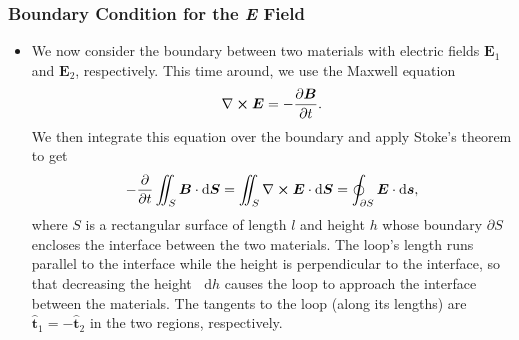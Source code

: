\documentclass[11pt, a4paper]{article}
\newcommand{\diff}{\mathop{}\!\mathrm{d}} %
\renewcommand{\vec}[1]{\bm{#1}} %
\newcommand{\uvec}[1]{\hat{\vec{#1}}} %
\newcommand{\E}{\vec{E}} %
\newcommand{\B}{\vec{B}} %
\renewcommand{\curl}{\nabla \cross}
\begin{document}
\subsubsection{Boundary Condition for the \textit{E} Field}
\begin{itemize}
	\item We now consider the boundary between two materials with electric fields $ \E_{1} $ and $ \E_{2} $, respectively. This time around, we use the Maxwell equation
	\begin{equation*}
		\curl \E = - \pdv{\B}{t}.
	\end{equation*}
	We then integrate this equation over the boundary and apply Stoke's theorem to get
	\begin{equation*}
        - \pdv{t}\iint_{S}\B \cdot \diff \vec{S} = \iint_{S} \curl \E \cdot \diff \vec{S} = \oint_{\partial S} \E \cdot \diff \vec{s},
	\end{equation*}
    where $ S $ is a rectangular surface of length $ l $ and height $ h $ whose boundary $ \partial S $ encloses the interface between the two materials. The loop's length runs parallel to the interface while the height is perpendicular to the interface, so that decreasing the height $ \diff h $ causes the loop to approach the interface between the materials. The tangents to the loop (along its lengths) are $ \uvec{t}_{1} = - \uvec{t}_{2} $ in the two regions, respectively. 
    

\end{itemize}
\end{document}
